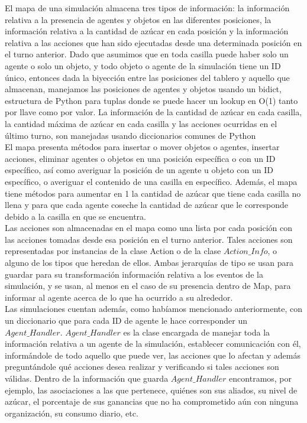 \documentclass[11pt]{article}
\begin{document}
El mapa de una simulación almacena tres tipos de información: la información relativa a la presencia de agentes y objetos en las diferentes posiciones, la información relativa a la cantidad de azúcar en cada posición y la información relativa a las acciones que han sido ejecutadas desde una determinada posición en el turno anterior. Dado que asumimos que en toda casilla puede haber solo un agente o solo un objeto, y todo objeto o agente de la simulación tiene un ID único, entonces dada la biyección entre las posiciones del tablero y aquello que almacenan, manejamos las posiciones de agentes y objetos usando un bidict, estructura de Python para tuplas donde se puede hacer un lookup en O(1) tanto por llave como por valor. La información de la cantidad de azúcar en cada casilla, la cantidad máxima de azúcar en cada casilla y las acciones ocurridas en el último turno, son manejadas usando diccionarios comunes de Python\\
El mapa presenta métodos para insertar o mover objetos o agentes, insertar acciones, eliminar agentes o objetos en una posición específica o con un ID específico, así como averiguar la posición de un agente u objeto con un ID específico, o averiguar el contenido de una casilla en específico. Además, el mapa tiene métodos para aumentar en 1 la cantidad de azúcar que tiene cada casilla no llena y para que cada agente coseche la cantidad de azúcar que le corresponde debido a la casilla en que se encuentra.\\
Las acciones son almacenadas en el mapa como una lista por cada posición con las acciones tomadas desde esa posición en el turno anterior. Tales acciones son representadas por instancias de la clase Action o de la clase $Action\_Info$, o alguno de los tipos que heredan de ellos. Ambas jerarquías de tipo se usan para guardar para su transformación información relativa a los eventos de la simulación, y se usan, al menos en el caso de su presencia dentro de Map, para informar al agente acerca de lo que ha ocurrido a su alrededor.\\
Las simulaciones cuentan además, como habíamos mencionado anteriormente, con un diccionario que para cada ID de agente le hace corresponder un $Agent\_Handler$. $Agent\_Handler$ es la clase encargada de manejar toda la información relativa a un agente de la simulación, establecer comunicación con él, informándole de todo aquello que puede ver, las acciones que lo afectan y además preguntándole qué acciones desea realizar y verificando si tales acciones son válidas. Dentro de la información que guarda $Agent\_Handler$ encontramos, por ejemplo, las asociaciones a las que pertenece, quiénes son sus aliados, su nivel de azúcar, el porcentaje de sus ganancias que no ha comprometido aún con ninguna organización, su consumo diario, etc.\\
\end{document}
